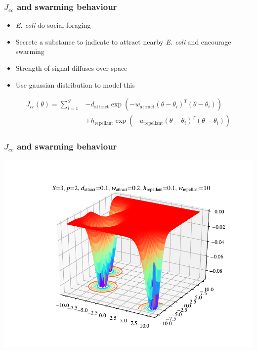 \documentclass{beamer}
\begin{document}
\begin{frame}
\frametitle{$J_{cc}$ and swarming behaviour}
\begin{itemize}
  \item \textit{\textit{E. coli}} do social foraging
  \item Secrete a substance to indicate to attract nearby \textit{\textit{E. coli}} and encourage swarming
  \item Strength of signal diffuses over space
  \item Use gaussian distribution to model this
\end{itemize}
\begin{align*}
J_{cc}(\theta) = \sum_{i=1}^S &-d_\text{attract} \exp \left( -w_\text{attract} (\theta - \theta_i)^T (\theta - \theta_i) \right) \\ &+ h_\text{repellant} \exp \left( -w_\text{repellant} (\theta - \theta_i)^T (\theta - \theta_i) \right)
\end{align*}
\end{frame}

\begin{frame}
\frametitle{$J_{cc}$ and swarming behaviour}
\begin{center}
\includegraphics[scale=0.5]{assets/swarming}
\end{center}
\end{frame}

\end{document}
